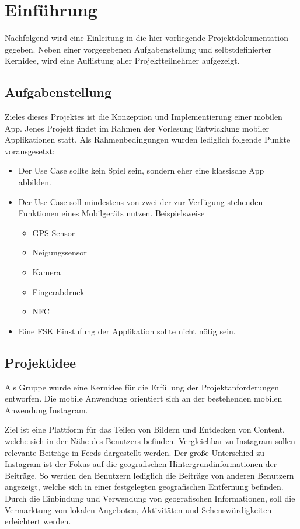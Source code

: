 \chapter{Einführung\label{chap1:Erstes-Kapitel}}

Nachfolgend wird eine Einleitung in die hier vorliegende Projektdokumentation gegeben. Neben einer vorgegebenen Aufgabenstellung und selbstdefinierter Kernidee, wird eine Auflistung aller Projektteilnehmer aufgezeigt.

\section{Aufgabenstellung\label{sec1.1:Unterpunkt-1}}

Zieles dieses Projektes ist die Konzeption und Implementierung einer mobilen App. Jenes Projekt findet im Rahmen der Vorlesung \glqq Entwicklung mobiler Applikationen\grqq{} statt. Als Rahmenbedingungen wurden lediglich folgende Punkte vorausgesetzt:

\begin{itemize}
    \item Der Use Case sollte kein Spiel sein, sondern eher eine klassische App abbilden.
    \item Der Use Case soll mindestens von zwei der zur Verfügung stehenden Funktionen eines Mobilgeräts nutzen. Beispielsweise
    \begin{itemize}
        \item GPS-Sensor
        \item Neigungssensor
        \item Kamera
        \item Fingerabdruck
        \item NFC
    \end{itemize}
    \item Eine FSK Einstufung der Applikation sollte nicht nötig sein.
\end{itemize}

\section{Projektidee\label{sec1.2:Unterpunkt-2}}

Als Gruppe wurde eine Kernidee für die Erfüllung der Projektanforderungen entworfen. Die mobile Anwendung orientiert sich an der bestehenden mobilen Anwendung \glqq Instagram\grqq{}.

Ziel ist eine Plattform für das Teilen von Bildern und Entdecken von Content, welche sich in der Nähe des Benutzers befinden. Vergleichbar zu Instagram sollen relevante Beiträge in Feeds dargestellt werden. Der große Unterschied zu Instagram ist der Fokus auf die geografischen Hintergrundinformationen der Beiträge. So werden den Benutzern lediglich die Beiträge von anderen Benutzern angezeigt, welche sich in einer festgelegten geografischen Entfernung befinden. Durch die Einbindung und Verwendung von geografischen Informationen, soll die Vermarktung von lokalen Angeboten, Aktivitäten und Sehenswürdigkeiten erleichtert werden.

